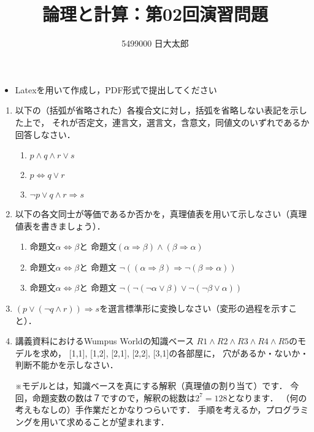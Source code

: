 \documentclass[dvipdfmx]{jsarticle}
\def\NO{02}
\def\LECTURENAME{論理と計算}
\begin{document}
\title{\LECTURENAME{}：第\NO{}回演習問題}

\author{5499000 日大太郎}

\date{}
\maketitle

\begin{itemize}
\item Latexを用いて作成し，PDF形式で提出してください
\end{itemize}


\vspace*{\baselineskip}

\begin{enumerate}\setlength{\itemsep}{\baselineskip}
\item 以下の（括弧が省略された）各複合文に対し，括弧を省略しない表記を示した上で，
  それが否定文，連言文，選言文，含意文，同値文のいずれであるか回答しなさい．

  \begin{enumerate}
  \item $p \land q \land r \lor s$
    
  \item $p\Leftrightarrow q\lor r$
    
  \item $\neg p \lor q \land r \Rightarrow s$
    
  \end{enumerate}

\item 以下の各文同士が等価であるか否かを，真理値表を用いて示しなさい（真理値表を書きましょう）．
  \begin{enumerate}
  \item
    命題文$\alpha\Leftrightarrow\beta$と
    命題文$(\alpha\Rightarrow\beta)\land (\beta\Rightarrow\alpha)$
  
  \item 
    命題文$\alpha\Leftrightarrow\beta$と
    命題文
    $\neg((\alpha\Rightarrow\beta)\Rightarrow\neg(\beta\Rightarrow\alpha))$

  \item
    命題文$\alpha\Leftrightarrow\beta$と
    命題文
    $\neg( \neg(\neg\alpha\lor\beta)\lor\neg(\neg\beta\lor\alpha) )$
  \end{enumerate}

\item
  $(p\lor(\neg q\land r))\Rightarrow s$を選言標準形に変換しなさい（変形の過程を示すこと）．

  
  
\item
  講義資料におけるWumpus Worldの知識ベース
  $R1 \land R2 \land R3 \land R4 \land R5$のモデルを求め，
  [1,1], [1,2], [2,1], [2,2], [3,1]の各部屋に，
  穴があるか・ないか・判断不能かを示しなさい．

  ※モデルとは，知識ベースを真にする解釈（真理値の割り当て）です．
  今回，命題変数の数は７ですので，解釈の総数は$2^7=128$となります．
  （何の考えもなしの）手作業だとかなりつらいです．
  手順を考えるか，プログラミングを用いて求めることが望まれます．


\end{enumerate}
\end{document}
